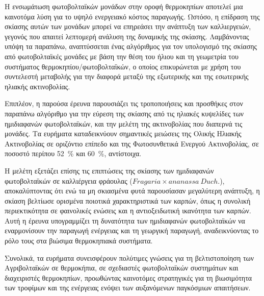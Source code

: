 \documentclass[12pt, a4paper]{report} %
\newcommand{\english}{\foreignlanguage{english}}
\begin{document}
    Η ενσωμάτωση φωτοβολταϊκών μονάδων στην οροφή θερμοκηπίων αποτελεί μια καινοτόμα λύση για το υψηλό 
    ενεργειακό κόστος παραγωγής. Ωστόσο, η επίδραση της σκίασης αυτών των μονάδων μπορεί να επηρεάσει την 
    ανάπτυξη των καλλιεργειών, γεγονός που απαιτεί λεπτομερή ανάλυση της δυναμικής της σκίασης. Λαμβάνοντας 
    υπόψη τα παραπάνω, αναπτύσσεται ένας αλγόριθμος για τον υπολογισμό της σκίασης από φωτοβολταϊκές μονάδες 
    με βάση την θέση του ήλιου και τη γεωμετρία του συστήματος θερμοκηπίου/φωτοβολταϊκών, ο οποίος 
    επικυρώνεται με χρήση του συντελεστή μεταβολής για την διαφορά μεταξύ της εξωτερικής και της εσωτερικής 
    ηλιακής ακτινοβολίας.

    Επιπλέον, η παρούσα έρευνα παρουσιάζει τις τροποποιήσεις και προσθήκες στον παραπάνω αλγόριθμο για την 
    εύρεση της σκίασης από τις ηλιακές κυψελίδες των ημιδιαφανών φωτοβολταϊκών, και την μελέτη της 
    ακτινοβολίας που διαπερνά τις μονάδες. Τα ευρήματα καταδεικνύουν σημαντικές μειώσεις της Ολικής 
    Ηλιακής Ακτινοβολίας σε οριζόντιο επίπεδο και της Φωτοσυνθετικά Ενεργού Ακτινοβολίας, σε ποσοστό περίπου \SI{52}{\percent}
    και \SI{60}{\percent}, αντίστοιχα.

    Η μελέτη εξετάζει επίσης τις επιπτώσεις της σκίασης των ημιδιαφανών φωτοβολταϊκών σε καλλιέργεια φράουλας 
    (\english{$Fragaria \times ananassa\:Duch.$}), αποκαλύπτοντας ότι ενώ τα μη σκιασμένα φυτά παρουσίασαν 
    μεγαλύτερη ανάπτυξη, η σκίαση βελτίωσε ορισμένα ποιοτικά χαρακτηριστικά των καρπών, όπως η συνολική 
    περιεκτικότητα σε φαινολικές ενώσεις και η αντιοξειδωτική ικανότητα των καρπών. Αυτή η έρευνα υπογραμμίζει τη 
    δυνατότητα των ημιδιαφανών φωτοβολταϊκών να εναρμονίσουν την παραγωγή ενέργειας και τη γεωργική παραγωγή, 
    αναδεικνύοντας το ρόλο τους στα βιώσιμα θερμοκηπιακά συστήματα. 

    Συνολικά, τα ευρήματα συνεισφέρουν πολύτιμες γνώσεις για τη βελτιστοποίηση των Αγριβολταϊκών σε 
    θερμοκήπια, σε σχεδιαστές φωτοβολταϊκών συστημάτων και διαχειριστές θερμοκηπίων, προωθώντας καινοτόμες στρατηγικές 
    για τη βιωσιμότητα των τροφίμων και της ενέργειας ενόψει των αυξανόμενων παγκόσμιων απαιτήσεων.


\newpage
\end{document}
